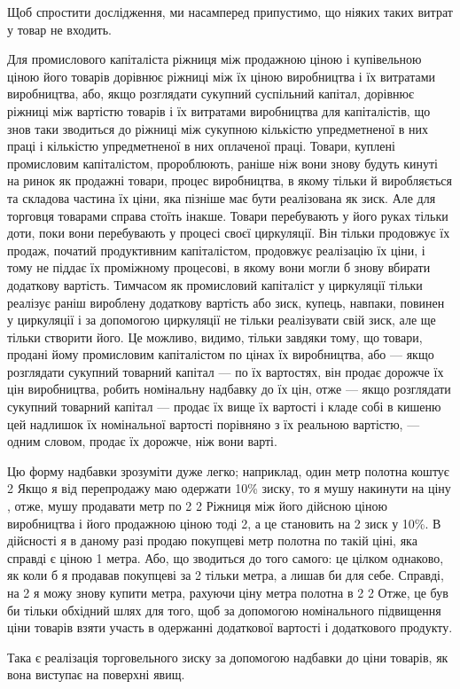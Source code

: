 \parcont{}  %
Щоб спростити дослідження, ми насамперед припустимо, що
ніяких таких витрат у товар не входить.

Для промислового капіталіста ріжниця між продажною ціною
і купівельною ціною його товарів дорівнює ріжниці між їх ціною
виробництва і їх витратами виробництва, або, якщо розглядати
сукупний суспільний капітал, дорівнює ріжниці між
вартістю товарів і їх витратами виробництва для капіталістів,
що знов таки зводиться до ріжниці між сукупною кількістю
упредметненої в них праці і кількістю упредметненої в них
оплаченої праці. Товари, куплені промисловим капіталістом, пророблюють,
раніше ніж вони знову будуть кинуті на ринок як
продажні товари, процес виробництва, в якому тільки й виробляється
та складова частина їх ціни, яка пізніше має бути
реалізована як зиск. Але для торговця товарами справа стоїть
інакше. Товари перебувають у його руках тільки доти, поки
вони перебувають у процесі своєї циркуляції. Він тільки продовжує
їх продаж, початий продуктивним капіталістом, продовжує
реалізацію їх ціни, і тому не піддає їх проміжному процесові,
в якому вони могли б знову вбирати додаткову вартість. Тимчасом
як промисловий капіталіст у циркуляції тільки реалізує
раніш вироблену додаткову вартість або зиск, купець, навпаки,
повинен у циркуляції і за допомогою циркуляції не тільки реалізувати
свій зиск, але ще тільки створити його. Це можливо,
видимо, тільки завдяки тому, що товари, продані йому промисловим
капіталістом по цінах їх виробництва, або — якщо розглядати
сукупний товарний капітал — по їх вартостях, він продає
дорожче їх цін виробництва, робить номінальну надбавку до
їх цін, отже — якщо розглядати сукупний товарний капітал —
продає їх вище їх вартості і кладе собі в кишеню цей надлишок
їх номінальної вартості порівняно з їх реальною вартістю, — одним
словом, продає їх дорожче, ніж вони варті.

Цю форму надбавки зрозуміти дуже легко; наприклад, один
метр полотна коштує 2 Якщо я від перепродажу маю
одержати 10\% зиску, то я мушу накинути на ціну , отже,
мушу продавати метр по 2 2 Ріжниця між його
дійсною ціною виробництва і його продажною ціною тоді \deq{} 2, а це становить на 2 зиск у 10\%. В дійсності
я в даному разі продаю покупцеві метр полотна по такій ціні,
яка справді є ціною 1 метра. Або, що зводиться до того
самого: це цілком однаково, як коли б я продавав покупцеві за
2 тільки  метра, а  лишав би для себе. Справді, на
2 я можу знову купити  метра, рахуючи ціну метра
полотна в 2 2 Отже, це був би тільки обхідний
шлях для того, щоб за допомогою номінального підвищення
ціни товарів взяти участь в одержанні додаткової вартості і додаткового
продукту.

Така є реалізація торговельного зиску за допомогою надбавки
до ціни товарів, як вона виступає на поверхні явищ.
\parbreak{}  %
